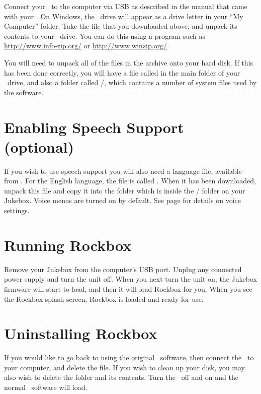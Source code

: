 Connect your \playername\ to the computer via USB as described in the 
manual that came with your \playername. On Windows, the \playername\ drive 
will appear as a drive letter in your ``My Computer'' folder. Take the file 
that you downloaded above, and unpack its contents to your \playername\ drive.
You can do this using a program such as \url{http://www.info-zip.org/} or 
\url{http://www.winzip.org/}.

You will need to unpack all of the files in the archive onto your hard disk. If 
this has been done correctly, you will have a file called 
\fname{\firmwarefilename} in the main folder of your \playername\ drive, and
also a folder called /, which contains a number of system files
used by the software.

\section{Enabling Speech Support (optional)}\label{sec:enabling_speech_support}
If you wish to use speech support you will also need a language file, available
from .  For the
English language, the file is called . When it has been
downloaded, unpack this file and copy it into the  folder which is
inside the / folder on your Jukebox. Voice menus are turned on
by default. See page \pageref{ref:Voiceconfiguration} for details on voice
settings.

\section{Running Rockbox}
Remove your Jukebox from the computer's USB port. Unplug any connected power
supply and turn the unit off. When you next turn the unit on, the Jukebox
firmware will start to load, and then it will load Rockbox for you. When you see
the Rockbox splash screen, Rockbox is loaded and ready for use.

\section{Uninstalling Rockbox}
If you would like to go back to using the original \playername\ software, then
connect the \playername\ to your computer, and delete the
\fname{\firmwarefilename} file. If you wish to clean up your disk, you may also
wish to delete the  folder and its contents. Turn the
\playername\ off and on and the normal \playername\ software will load.

